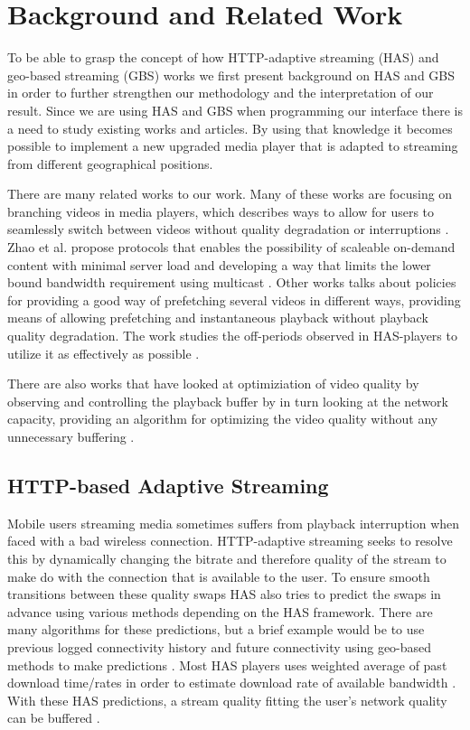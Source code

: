\documentclass[9pt,a4paper]{acmproc}
\begin{document}
\section{Background and Related Work}
To be able to grasp the concept of how HTTP-adaptive streaming (HAS) and geo-based streaming (GBS) works we first present background on HAS and GBS in order to further strengthen our methodology and the interpretation of our result. Since we are using HAS and GBS when programming our interface there is a need to study existing works and articles. By using that knowledge it becomes possible to implement a new upgraded media player that is adapted to streaming from different geographical positions.

There are many related works to our work. Many of these works are focusing on branching videos in media players, which describes ways to allow for users to seamlessly switch between videos without quality degradation or interruptions \cite{qualbranch, hasmultipath,scalableOnDemand}. Zhao et al. \cite{scalableOnDemand} propose protocols that enables the possibility of scaleable on-demand content with minimal server load and developing a way that limits the lower bound bandwidth requirement using multicast \cite{scalableOnDemand}. Other works talks about policies for providing a good way of prefetching several videos in different ways, providing means of allowing prefetching and instantaneous playback without playback quality degradation. The work studies the off-periods observed in HAS-players to utilize it as effectively as possible \cite{bandawarePrefetch}.

There are also works that have looked at optimiziation of video quality by observing and controlling the playback buffer by in turn looking at the network capacity, providing an algorithm for optimizing the video quality without any unnecessary buffering \cite{bufferbased}.

\subsection{HTTP-based Adaptive Streaming}
Mobile users streaming media sometimes suffers from playback interruption when faced with a bad wireless connection. HTTP-adaptive streaming seeks to resolve this by dynamically changing the bitrate and therefore quality of the stream to make do with the connection that is available to the user. To ensure smooth transitions between these quality swaps HAS also tries to predict the swaps in advance using various methods depending on the HAS framework. There are many algorithms for these predictions, but a brief example would be to use previous logged connectivity history and future connectivity using geo-based methods to make predictions \cite{gtube}. Most HAS players uses weighted average of past download time/rates in order to estimate download rate of available bandwidth \cite{qualbranch}. With these HAS predictions, a stream quality fitting the user’s network quality can be buffered \cite{gtube}.
\end{document}

